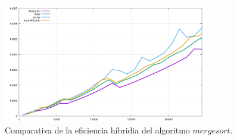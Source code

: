 \documentclass[11pt,a4paper]{article}
\begin{document}
\begin{figure}[H]
	\centering
	\includegraphics[width=0.8\textwidth]{../plots/mergesort}
	\caption{Comparativa de la eficiencia híbridia del algoritmo $mergesort$.}
\end{figure}
\end{document}
